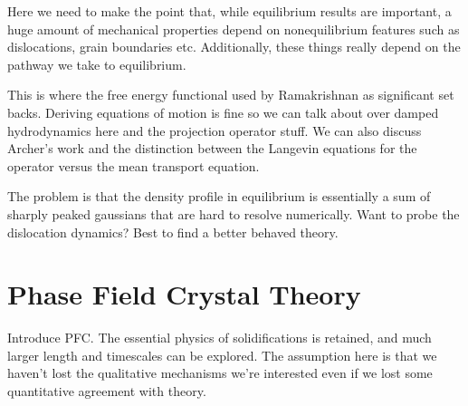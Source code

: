 { \color{ForestGreen} { \bfseries
    
    
    Here we need to make the point that, while equilibrium results are important, a huge amount of mechanical properties depend on nonequilibrium features such as dislocations, grain boundaries etc. Additionally, these things really depend on the pathway we take to equilibrium. 

    This is where the free energy functional used by Ramakrishnan as significant set backs. Deriving equations of motion is fine so we can talk about over damped hydrodynamics here and the projection operator stuff. We can also discuss Archer's work and the distinction between the Langevin equations for the operator versus the mean transport equation.

    The problem is that the density profile in equilibrium is essentially a sum of sharply peaked gaussians that are hard to resolve numerically. Want to probe the dislocation dynamics? Best to find a better behaved theory.}
}

\section{Phase Field Crystal Theory} %

{\color{ForestGreen} {\bfseries


    Introduce PFC. The essential physics of solidifications is retained, and much larger length and timescales can be explored. The assumption here is that we haven't lost the qualitative mechanisms we're interested even if we lost some quantitative agreement with theory.}
}

